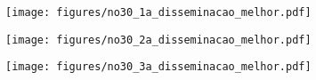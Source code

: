 \documentclass[12pt]{article}
\begin{document}
\begin{comment}
	\begin{minipage}{0.49\linewidth}
        \relsize{-1.0}
        \centering
        \captionof{table}{Dis. eventos}
        \vspace{-7.0pt}
        \label{tab:disseminaEventos}
        {
        {\small
        \begin{tabular}{l|c|c|c}
        \hlineB{2}
        \multirow{2}{*}{\textbf{Nós}} & \multicolumn{3}{c}{\textbf{Métricas}} \\ \cline{2-4} 
                     & \textbf{HR}       & \textbf{FR}      & \textbf{ADE}      \\ \hline
        30                   & 97,14\%  & 12,86\% & 166ms    \\ 
        53                   & 94,29\%  & 15,71\% & 93ms     \\ \hline
        70                   & 65,71\%  & 34,29\% & 82ms     \\ 
        92                   & 71,43\%  & 28,57\% & 56ms     \\ \hline
        95                   & 74,29\%  & 25,71\% & 54ms     \\ 
        98                   & 65,71\%  & 34,29\% & 88ms     \\ \hlineB{2}
        \end{tabular}
        }
        } %
	\end{minipage}
	\hspace{-1cm}
	\begin{minipage}{0.49\linewidth}
	    \centering
		\texttt{[image: figures/total\_tries.png]}
		\vspace{-8.0pt}
		\captionof{figure}{No. de disseminações}
		\label{fig:tentativasD}
	\end{minipage}

\end{comment}

\vspace{-0.2cm}

\begin{figure}[H]
\centering
	\begin{minipage}[t]{0.32\linewidth}
		\texttt{[image: figures/no30\_1a\_disseminacao\_melhor.pdf]}
	\end{minipage}
	\begin{minipage}[t]{0.32\linewidth}
		\texttt{[image: figures/no30\_2a\_disseminacao\_melhor.pdf]}
	\end{minipage}
	\begin{minipage}[t]{0.32\linewidth}
		\texttt{[image: figures/no30\_3a\_disseminacao\_melhor.pdf]}
	\end{minipage}
	\vspace{-4.0pt}
	\label{fig:no30melhor}
\end{figure}
\end{document}
